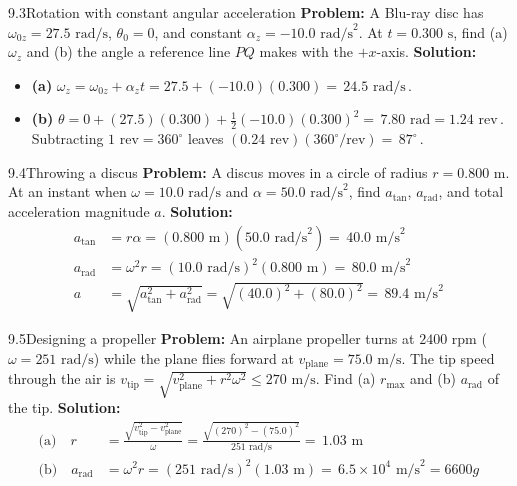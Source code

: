 \documentclass[11pt,a4paper,openany,oneside]{book}
\newcommand{\eqbox}[1]{\boxed{\,#1\,}}
\numberwithin{equation}{chapter}
\newcommand{\bk}[1]{\texorpdfstring{\enspace{\normalfont\small\color{slate}[Book #1]}}{ [Book #1]}}
\begin{document}
\begin{example}{9.3}{Rotation with constant angular acceleration\bk{p.\ 285}}
\textbf{Problem:} A Blu-ray disc has $\omega_{0z} = 27.5\text{ rad/s}$, $\theta_0 = 0$, and constant $\alpha_z = -10.0\text{ rad/s}^2$. At $t = 0.300\text{ s}$, find (a) $\omega_z$ and (b) the angle a reference line $PQ$ makes with the $+x$-axis.
\tcblower
\textbf{Solution:}
\begin{itemize}
  \item \textbf{(a)} $\omega_z = \omega_{0z} + \alpha_z t = 27.5 + (-10.0)(0.300) = \eqbox{24.5\text{ rad/s}}$.
  \item \textbf{(b)} $\theta = 0 + (27.5)(0.300) + \frac{1}{2}(-10.0)(0.300)^2 = \eqbox{7.80\text{ rad} = 1.24\text{ rev}}$. Subtracting $1\text{ rev} = 360^\circ$ leaves $(0.24\text{ rev})(360^\circ/\text{rev}) = \eqbox{87^\circ}$.
\end{itemize}
\end{example}

\begin{example}{9.4}{Throwing a discus\bk{p.\ 287}}
\textbf{Problem:} A discus moves in a circle of radius $r = 0.800\text{ m}$. At an instant when $\omega = 10.0\text{ rad/s}$ and $\alpha = 50.0\text{ rad/s}^2$, find $a_{\text{tan}}$, $a_{\text{rad}}$, and total acceleration magnitude $a$.
\tcblower
\textbf{Solution:}
\begin{align*}
  a_{\text{tan}} &= r\alpha = (0.800\text{ m})(50.0\text{ rad/s}^2) = \eqbox{40.0\text{ m/s}^2}\\
  a_{\text{rad}} &= \omega^2 r = (10.0\text{ rad/s})^2(0.800\text{ m}) = \eqbox{80.0\text{ m/s}^2}\\
  a &= \sqrt{a_{\text{tan}}^2 + a_{\text{rad}}^2} = \sqrt{(40.0)^2 + (80.0)^2} = \eqbox{89.4\text{ m/s}^2}
\end{align*}
\end{example}

\begin{example}{9.5}{Designing a propeller\bk{p.\ 288}}
\textbf{Problem:} An airplane propeller turns at $2400\text{ rpm}$ ($\omega = 251\text{ rad/s}$) while the plane flies forward at $v_{\text{plane}} = 75.0\text{ m/s}$. The tip speed through the air is $v_{\text{tip}} = \sqrt{v_{\text{plane}}^2 + r^2\omega^2} \le 270\text{ m/s}$. Find (a) $r_{\max}$ and (b) $a_{\text{rad}}$ of the tip.
\tcblower
\textbf{Solution:}
\begin{align*}
  \text{(a)}\quad r &= \frac{\sqrt{v_{\text{tip}}^2 - v_{\text{plane}}^2}}{\omega} = \frac{\sqrt{(270)^2 - (75.0)^2}}{251\text{ rad/s}} = \eqbox{1.03\text{ m}}\\
  \text{(b)}\quad a_{\text{rad}} &= \omega^2 r = (251\text{ rad/s})^2(1.03\text{ m}) = \eqbox{6.5\times 10^4\text{ m/s}^2 = 6600g}
\end{align*}
\end{example}
\end{document}
